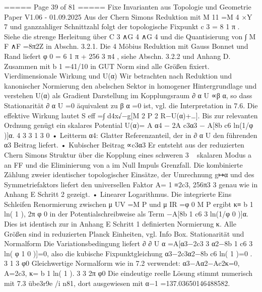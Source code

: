\begin{MyVerbatim}
{===== Page 39 of 81 =====
Fixe Invarianten aus Topologie und Geometrie
Paper V1.06 - 01.09.2025
Aus der Chern Simons Reduktion mit M 11 =M 4 ×Y 7 und ganzzahliger Schnittzahl folgt der topologische Fixpunkt
c 3 = 8 1 π .
Siehe die strenge Herleitung über C 3 ∧G 4 ∧G 4 und die Quantisierung von ∫ M F ∧F =8π2Z in Abschn. 3.2.1. Die
4
Möbius Reduktion mit Gauss Bonnet und Rand liefert
φ 0 = 6 1 π + 256 3 π4 ,
siehe Abschn. 3.2.2 und Anhang D. Zusammen mit b 1 =41/10 in GUT Norm sind alle Größen fixiert.
Vierdimensionale Wirkung und U(α)
Wir betrachten nach Reduktion und kanonischer Normierung den abelschen Sektor in homogener Hintergrundlage und
verstehen U(α) als Gradient Darstellung im Kopplungsraum
∂ α U ∝β α,
so dass Stationarität ∂ α U =0 äquivalent zu β α =0 ist, vgl. die Interpretation in 7.6. Die effektive Wirkung lautet
S eff =∫ d4x√−g[M 2 P 2 R−U(α)+…].
Bis zur relevanten Ordnung genügt ein skalares Potential
U(α)= A α4 − 2A c3α3 − A[8b c6 ln(1/φ )]α.
4 3 3 1 3 0
• Leitterm α4: Glatter Referenzanteil, der in ∂ α U den führenden α3 Beitrag liefert.
• Kubischer Beitrag ∝c3α3 Er entsteht aus der reduzierten Chern Simons Struktur über die Kopplung eines schweren
3
~
skalaren Modus a an FF und die Eliminierung von a im Null Impuls Grenzfall. Die kombinierte Zählung zweier identischer
topologischer Einsätze, der Umrechnung g↦α und des Symmetriefaktors liefert den universellen Faktor
A= 1 ≡2c3,
256π3 3
genau wie in Anhang E Schritt 2 gezeigt.
• Linearer Logarithmus. Die integrierte Eins Schleifen Renormierung zwischen μ UV =M P und μ IR =φ 0 M P ergibt
κ≡ b 1 ln( 1 ),
2π φ
0
in der Potentialschreibweise als Term −A[8b 1 c6 3 ln(1/φ 0 )]α. Dies ist identisch zur in Anhang E Schritt 1 definierten
Normierung κ.
Alle Größen sind in reduzierten Planck Einheiten, vgl. Info Box.
Stationarität und Normalform
Die Variationsbedingung liefert
∂
∂
U
α
=A[α3−2c3
3
α2−8b
1
c6
3
ln(
φ
1
0
)]=0,
also die kubische Fixpunktgleichung
α3−2c3α2−8b c6 ln( 1 )=0 .
3 1 3 φ0
Gleichwertige Normalform wie in 7.2 verwendet:
α3−Aα2−Ac2κ=0, A=2c3, κ= b 1 ln( 1 ).
3 3 2π φ0
Die eindeutige reelle Lösung stimmt numerisch mit 7.3 übe3r9e /i n81, dort ausgewiesen mit α−1 =137.03650146488582.

}
\end{MyVerbatim}
